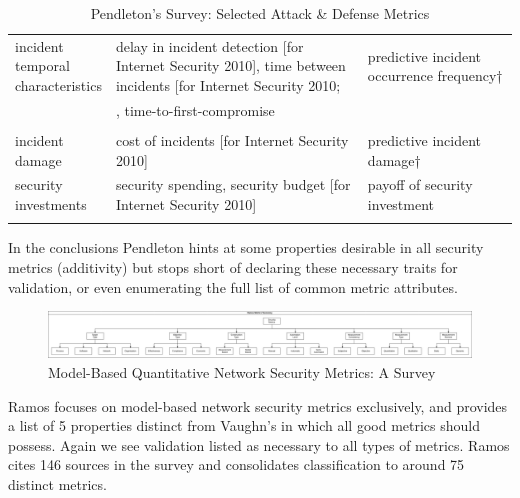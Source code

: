 \begin{tiny}
\begin{longtable}{@{}|p{0.2\linewidth}|p{0.5\linewidth}|p{0.3\linewidth}|@{}}
incident temporal characteristics & delay in incident detection {[}for Internet Security 2010{]}, time between incidents {[}for Internet Security 2010; & predictive incident occurrence frequency† \\
 & \cite{Jonsson_Olovsson_1997, Madan_Gogeva-Popstojanova_Vaidyanathan_Trivedi_2002, Holm_2014}, time-to-first-compromise &  \\
 & \cite{Jonsson_Olovsson_1997,Madan_Gogeva-Popstojanova_Vaidyanathan_Trivedi_2002,Holm_2014} &  \\
incident damage & cost of incidents {[}for Internet Security 2010{]} & predictive incident damage† \\
security investments & security spending\cite{Chew_Swanson_Stine_Bartol_Brown_Robinson_2008}, security budget {[}for Internet Security 2010{]} & payoff of security investment \\* \bottomrule
\caption{Pendleton's Survey: Selected Attack \& Defense Metrics\cite{Pendleton_Garcia-Lebron_Cho_Xu_2016}}
\label{tab:pendleton_metrics}\\
\end{longtable}
\end{tiny}

In the conclusions Pendleton hints at some properties desirable in all security metrics (additivity) but stops short of declaring these necessary traits for validation, or even enumerating the full list of common metric attributes. 


\begin{figure}[ht]
\centering
\includegraphics[width=.95\linewidth]{resource/img/ch_background/cybok_metrics/ramos_taxonomy.png}
\caption{Model-Based Quantitative Network Security Metrics: A Survey\cite{Ramos_Lazar_Filho_Rodrigues_2017}}
\label{fig:background:ramos_taxonomy}
\end{figure} 

Ramos\cite{Ramos_Lazar_Filho_Rodrigues_2017} focuses on model-based network security metrics exclusively, and provides a list of 5 properties distinct from Vaughn’s in \cite{Vaughn_Henning_Siraj_2003} which all good metrics should possess. Again we see validation listed as necessary to all types of metrics. Ramos cites 146 sources in the survey and consolidates classification to around 75 distinct metrics.


